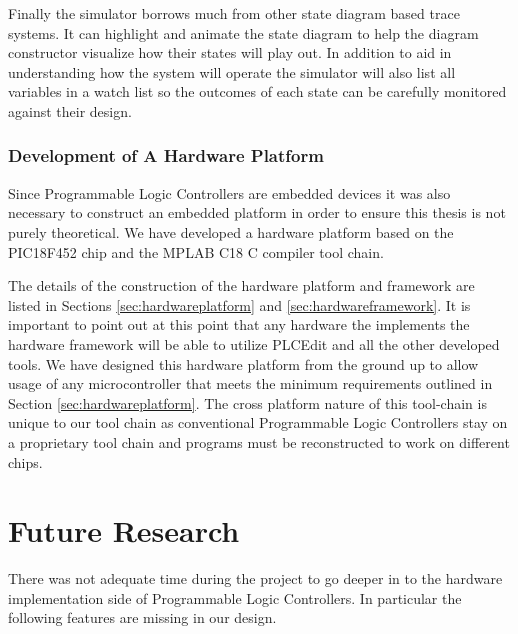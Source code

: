 Finally the simulator borrows much from other state diagram based trace systems. It can highlight and animate the state diagram to help the diagram constructor visualize how their states will play out. In addition to aid in understanding how the system will operate the simulator will also list all variables in a watch list so the outcomes of each state can be carefully monitored against their design.

\subsubsection{Development of A Hardware Platform}
Since Programmable Logic Controllers are embedded devices it was also necessary to construct an embedded platform in order to ensure this thesis is not purely theoretical. We have developed a hardware platform based on the PIC18F452 chip and the MPLAB C18 C compiler tool chain.

The details of the construction of the hardware platform and framework are listed in Sections \ref{sec:hardwareplatform} and \ref{sec:hardwareframework}. It is important to point out at this point that any hardware the implements the hardware framework will be able to utilize PLCEdit and all the other developed tools. We have designed this hardware platform from the ground up to allow usage of any microcontroller that meets the minimum requirements outlined in Section \ref{sec:hardwareplatform}. The cross platform nature of this tool-chain is unique to our tool chain as conventional Programmable Logic Controllers stay on a proprietary tool chain and programs must be reconstructed to work on different chips.


\section{Future Research}
There was not adequate time during the project to go deeper in to the hardware implementation side of Programmable Logic Controllers. In particular the following features are missing in our design.

